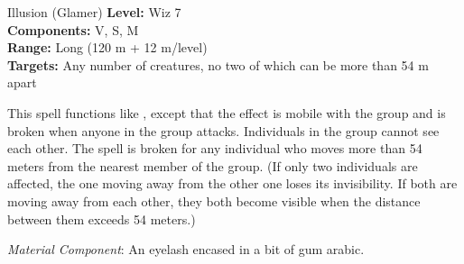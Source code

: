 {Illusion (Glamer)}
{
	\textbf{Level:}
	Wiz 7\\
	\textbf{Components:}
	V, S, M\\
	\textbf{Range:}
	Long (120 m + 12 m/level)\\
	\textbf{Targets:}
	Any number of creatures, no two of which can be more than 54 m apart\\
}
{
	This spell functions like , except that the effect is mobile with the group and is broken when anyone in the group attacks. Individuals in the group cannot see each other. The spell is broken for any individual who moves more than 54 meters from the nearest member of the group. (If only two individuals are affected, the one moving away from the other one loses its invisibility. If both are moving away from each other, they both become visible when the distance between them exceeds 54 meters.)

	\textit{Material Component}:
	An eyelash encased in a bit of gum arabic.

}
